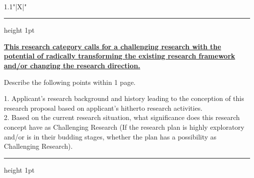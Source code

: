 \documentclass[8pt]{extarticle}
\makeatletter
\newcommand{\thickhline}{%
	\noalign {\ifnum 0=`}\fi \hrule height 1pt
	\futurelet \reserved@a \@xhline
}
\makeatother
\begin{document}
	
\noindent\textbf{\fontsize{12}{12}\selectfont {}}\\
\begin{tabularx}{1.1\linewidth}{"|X|"}
	\thickhline
	\underline{\textbf{This research category calls for a challenging research with the potential of radically transforming the existing research framework}}\\
	\underline{\textbf{and/or changing the research direction.}}
	
	Describe the following points within 1 page.

	1. Applicant's research background and history leading to the conception of this research proposal based on applicant's hitherto research activities.\\
	2. Based on the current research situation, what significance does this research concept have as Challenging Research (If the research plan is highly exploratory and/or is in their budding stages, whether the plan has a possibility as Challenging Research).
	\\
	\thickhline
\end{tabularx}
\end{document}
